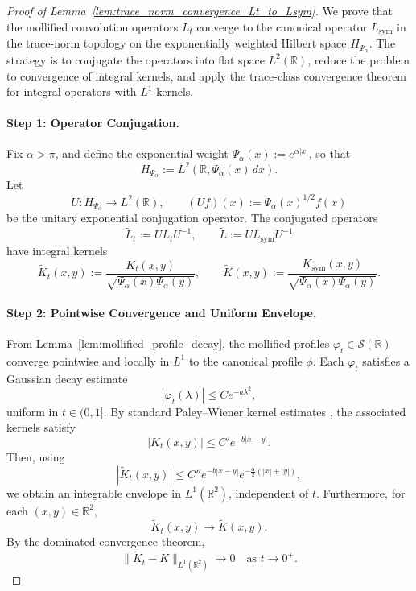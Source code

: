 \begin{proof}[Proof of Lemma~\ref{lem:trace_norm_convergence_Lt_to_Lsym}]
We prove that the mollified convolution operators \( L_t \) converge to the canonical operator \( L_{\mathrm{sym}} \) in the trace-norm topology on the exponentially weighted Hilbert space \( H_{\Psi_\alpha} \). The strategy is to conjugate the operators into flat space \( L^2(\mathbb{R}) \), reduce the problem to convergence of integral kernels, and apply the trace-class convergence theorem for integral operators with \( L^1 \)-kernels.

\paragraph{Step 1: Operator Conjugation.}
Fix \( \alpha > \pi \), and define the exponential weight \( \Psi_\alpha(x) := e^{\alpha |x|} \), so that
\[
H_{\Psi_\alpha} := L^2(\mathbb{R}, \Psi_\alpha(x)\, dx).
\]
Let
\[
U \colon H_{\Psi_\alpha} \to L^2(\mathbb{R}), \qquad (Uf)(x) := \Psi_\alpha(x)^{1/2} f(x)
\]
be the unitary exponential conjugation operator. The conjugated operators
\[
\widetilde{L}_t := U L_t U^{-1}, \qquad \widetilde{L} := U L_{\mathrm{sym}} U^{-1}
\]
have integral kernels
\[
\widetilde{K}_t(x,y) := \frac{K_t(x,y)}{\sqrt{\Psi_\alpha(x)\Psi_\alpha(y)}}, \qquad
\widetilde{K}(x,y) := \frac{K_{\mathrm{sym}}(x,y)}{\sqrt{\Psi_\alpha(x)\Psi_\alpha(y)}}.
\]

\paragraph{Step 2: Pointwise Convergence and Uniform Envelope.}
From Lemma~\ref{lem:mollified_profile_decay}, the mollified profiles \( \varphi_t \in \mathcal{S}(\mathbb{R}) \) converge pointwise and locally in \( L^1 \) to the canonical profile \( \phi \). Each \( \varphi_t \) satisfies a Gaussian decay estimate
\[
|\varphi_t(\lambda)| \le C e^{-a\lambda^2},
\]
uniform in \( t \in (0,1] \). By standard Paley--Wiener kernel estimates \cite[Thm.~IX.12]{ReedSimon1975II}, the associated kernels satisfy
\[
|K_t(x,y)| \le C' e^{-b|x - y|}.
\]
Then, using
\[
|\widetilde{K}_t(x,y)| \le C'' e^{-b|x - y|} e^{-\frac{\alpha}{2}(|x| + |y|)},
\]
we obtain an integrable envelope in \( L^1(\mathbb{R}^2) \), independent of \( t \). Furthermore, for each \( (x,y) \in \mathbb{R}^2 \),
\[
\widetilde{K}_t(x,y) \to \widetilde{K}(x,y).
\]
By the dominated convergence theorem,
\[
\| \widetilde{K}_t - \widetilde{K} \|_{L^1(\mathbb{R}^2)} \to 0 \quad \text{as } t \to 0^+.
\]


\end{proof}
